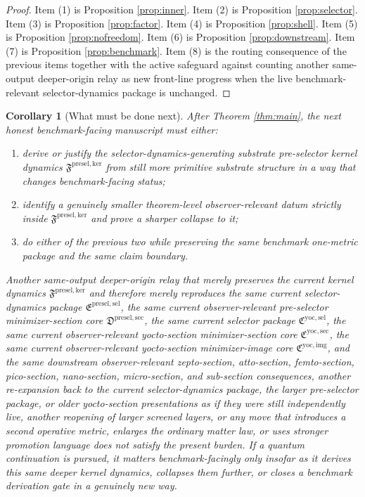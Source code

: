 \documentclass[11pt]{article}
\newcommand{\YoctoImageCore}{\mathfrak C^{\mathrm{yoc,img}}}
\newcommand{\YoctoMinSectionCore}{\mathfrak C^{\mathrm{yoc,sec}}}
\newcommand{\YoctoSelectorPackage}{\mathfrak C^{\mathrm{yoc,sel}}}
\newcommand{\PreSelectorMinSectionCore}{\mathfrak D^{\mathrm{presel,sec}}}
\newcommand{\PreSectionSelectorPackage}{\mathfrak E^{\mathrm{presel,sel}}}
\newcommand{\KernelPackage}{\mathfrak F^{\mathrm{presel,ker}}}
\newtheorem{corollary}{Corollary}
\begin{document}
\begin{proof}
Item (1) is Proposition \ref{prop:inner}. Item (2) is Proposition \ref{prop:selector}. Item (3) is Proposition \ref{prop:factor}. Item (4) is Proposition \ref{prop:shell}. Item (5) is Proposition \ref{prop:nofreedom}. Item (6) is Proposition \ref{prop:downstream}. Item (7) is Proposition \ref{prop:benchmark}. Item (8) is the routing consequence of the previous items together with the active safeguard against counting another same-output deeper-origin relay as new front-line progress when the live benchmark-relevant selector-dynamics package is unchanged.
\end{proof}

\begin{corollary}[What must be done next]
\label{cor:next}
After Theorem \ref{thm:main}, the next honest benchmark-facing manuscript must either:
\begin{enumerate}
    \item derive or justify the selector-dynamics-generating substrate pre-selector kernel dynamics \(\KernelPackage\) from still more primitive substrate structure in a way that changes benchmark-facing status;
    \item identify a genuinely smaller theorem-level observer-relevant datum strictly inside \(\KernelPackage\) and prove a sharper collapse to it;
    \item do either of the previous two while preserving the same benchmark one-metric package and the same claim boundary.
\end{enumerate}
Another same-output deeper-origin relay that merely preserves the current kernel dynamics \(\KernelPackage\) and therefore merely reproduces the same current selector-dynamics package \(\PreSectionSelectorPackage\), the same current observer-relevant pre-selector minimizer-section core \(\PreSelectorMinSectionCore\), the same current selector package \(\YoctoSelectorPackage\), the same current observer-relevant yocto-section minimizer-section core \(\YoctoMinSectionCore\), the same current observer-relevant yocto-section minimizer-image core \(\YoctoImageCore\), and the same downstream observer-relevant zepto-section, atto-section, femto-section, pico-section, nano-section, micro-section, and sub-section consequences, another re-expansion back to the current selector-dynamics package, the larger pre-selector package, or older yocto-section presentations as if they were still independently live, another reopening of larger screened layers, or any move that introduces a second operative metric, enlarges the ordinary matter law, or uses stronger promotion language does not satisfy the present burden. If a quantum continuation is pursued, it matters benchmark-facingly only insofar as it derives this same deeper kernel dynamics, collapses them further, or closes a benchmark derivation gate in a genuinely new way.
\end{corollary}
\end{document}
